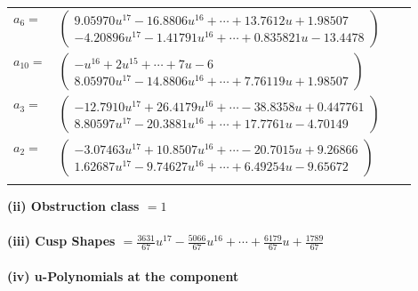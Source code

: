 \documentclass[1p]{elsarticle_modified}
\theoremstyle{definition}
\begin{document}
\begin{tabular}{m{7pt} m{180pt} m{7pt} m{180pt} }
\flushright $a_{6}=$&$\begin{pmatrix}9.05970 u^{17}-16.8806 u^{16}+\cdots+13.7612 u+1.98507\\-4.20896 u^{17}-1.41791 u^{16}+\cdots+0.835821 u-13.4478\end{pmatrix}$ \\
\flushright $a_{10}=$&$\begin{pmatrix}- u^{16}+2 u^{15}+\cdots+7 u-6\\8.05970 u^{17}-14.8806 u^{16}+\cdots+7.76119 u+1.98507\end{pmatrix}$ \\
\flushright $a_{3}=$&$\begin{pmatrix}-12.7910 u^{17}+26.4179 u^{16}+\cdots-38.8358 u+0.447761\\8.80597 u^{17}-20.3881 u^{16}+\cdots+17.7761 u-4.70149\end{pmatrix}$ \\
\flushright $a_{2}=$&$\begin{pmatrix}-3.07463 u^{17}+10.8507 u^{16}+\cdots-20.7015 u+9.26866\\1.62687 u^{17}-9.74627 u^{16}+\cdots+6.49254 u-9.65672\end{pmatrix}$\\&\end{tabular}
\flushleft \textbf{(ii) Obstruction class $= 1$}\\~\\
\flushleft \textbf{(iii) Cusp Shapes $= \frac{3631}{67} u^{17}-\frac{5066}{67} u^{16}+\cdots+\frac{6179}{67} u+\frac{1789}{67}$}\\~\\
\newpage\renewcommand{\arraystretch}{1}
\flushleft \textbf{(iv) u-Polynomials at the component}\newline \\
\end{document}
